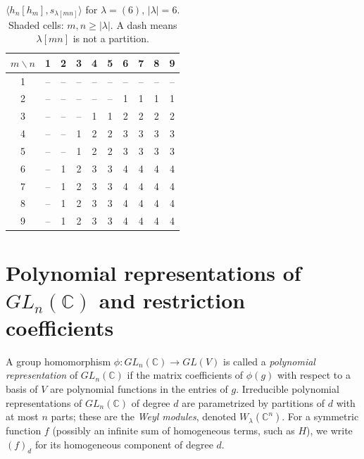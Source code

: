 \documentclass[reqno]{amsart}
\theoremstyle{plain}
\theoremstyle{definition}
\theoremstyle{remark}
\theoremstyle{plain}
\newcommand{\C}{\mathbb{C}}
\begin{document}
\begin{table}[H]\centering
\caption{$\langle h_n[h_m], s_{\lambda[mn]}\rangle$ for $\lambda=(6)$, $|\lambda|=6$. Shaded cells: $m,n\ge|\lambda|$. A dash means $\lambda[mn]$ is not a partition.}\label{table-6}
\begin{tabular}{c|ccccccccc}
$m \backslash n$ & 1 & 2 & 3 & 4 & 5 & 6 & 7 & 8 & 9 \\ \hline
1 & -- & -- & -- & -- & -- & -- & -- & -- & -- \\
2 & -- & -- & -- & -- & -- & 1 & 1 & 1 & 1 \\
3 & -- & -- & -- & 1 & 1 & 2 & 2 & 2 & 2 \\
4 & -- & -- & 1 & 2 & 2 & 3 & 3 & 3 & 3 \\
5 & -- & -- & 1 & 2 & 2 & 3 & 3 & 3 & 3 \\
6 & -- & 1 & 2 & 3 & 3 & \cellcolor{gray!25}4 & \cellcolor{gray!25}4 & \cellcolor{gray!25}4 & \cellcolor{gray!25}4 \\
7 & -- & 1 & 2 & 3 & 3 & \cellcolor{gray!25}4 & \cellcolor{gray!25}4 & \cellcolor{gray!25}4 & \cellcolor{gray!25}4 \\
8 & -- & 1 & 2 & 3 & 3 & \cellcolor{gray!25}4 & \cellcolor{gray!25}4 & \cellcolor{gray!25}4 & \cellcolor{gray!25}4 \\
9 & -- & 1 & 2 & 3 & 3 & \cellcolor{gray!25}4 & \cellcolor{gray!25}4 & \cellcolor{gray!25}4 & \cellcolor{gray!25}4 \\
\end{tabular}
\end{table}

\section{Polynomial representations of \texorpdfstring{$GL_n(\C)$}{GLn(C)} and restriction coefficients}\label{section-on-polynomial-rep}
A group homomorphism $\phi\colon GL_n(\C)\to GL(V)$ is called a
\emph{polynomial representation} of $GL_n(\C)$ if the matrix coefficients of
$\phi(g)$ with respect to a basis of $V$ are polynomial functions in the
entries of $g$. Irreducible polynomial representations of $GL_n(\C)$ of degree
$d$ are parametrized by partitions of $d$ with at most $n$ parts; these are the
\emph{Weyl modules}, denoted $W_\lambda(\C^n)$. For a symmetric function $f$
(possibly an infinite sum of homogeneous terms, such as $H$), we write $(f)_d$
for its homogeneous component of degree $d$.
\end{document}
